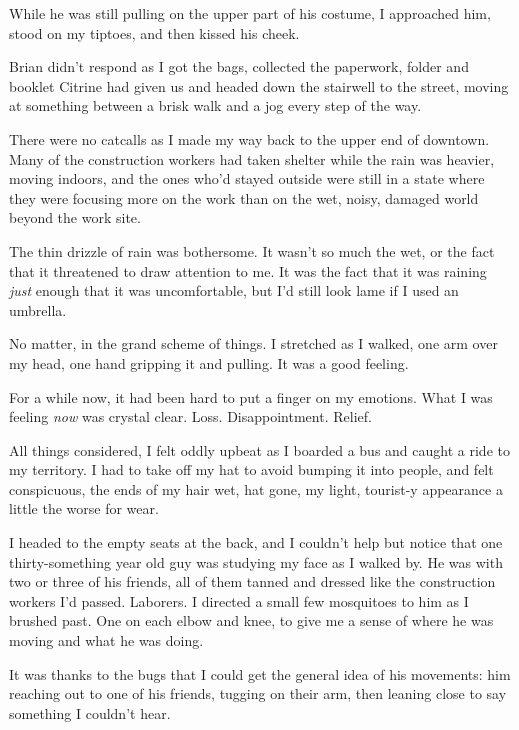 While he was still pulling on the upper part of his costume, I approached him, stood on my tiptoes, and then kissed his cheek.



Brian didn't respond as I got the bags, collected the paperwork, folder and booklet Citrine had given us and headed down the stairwell to the street, moving at something between a brisk walk and a jog every step of the way.



There were no catcalls as I made my way back to the upper end of downtown.  Many of the construction workers had taken shelter while the rain was heavier, moving indoors, and the ones who'd stayed outside were still in a state where they were focusing more on the work than on the wet, noisy, damaged world beyond the work site.



The thin drizzle of rain was bothersome.  It wasn't so much the wet, or the fact that it threatened to draw attention to me.  It was the fact that it was raining \emph{just} enough that it was uncomfortable, but I'd still look lame if I used an umbrella.



No matter, in the grand scheme of things.  I stretched as I walked, one arm over my head, one hand gripping it and pulling.  It was a good feeling.



For a while now, it had been hard to put a finger on my emotions.  What I was feeling \emph{now} was crystal clear.  Loss.  Disappointment.  Relief.



All things considered, I felt oddly upbeat as I boarded a bus and caught a ride to my territory.  I had to take off my hat to avoid bumping it into people, and felt conspicuous, the ends of my hair wet, hat gone, my light, tourist-y appearance a little the worse for wear.



I headed to the empty seats at the back, and I couldn't help but notice that one thirty-something year old guy was studying my face as I walked by.  He was with two or three of his friends, all of them tanned and dressed like the construction workers I'd passed.  Laborers.  I directed a small few mosquitoes to him as I brushed past.  One on each elbow and knee, to give me a sense of where he was moving and what he was doing.



It was thanks to the bugs that I could get the general idea of his movements: him reaching out to one of his friends, tugging on their arm, then leaning close to say something I couldn't hear.



